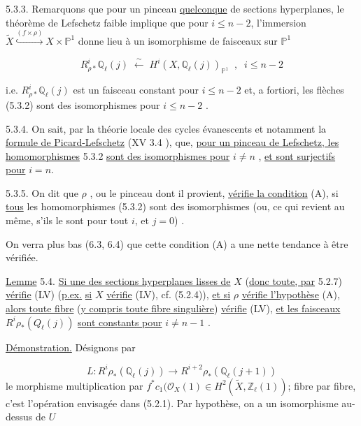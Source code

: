 5.3.3. Remarquons que pour un pinceau \underline{quelconque} de sections hyperplanes, le théorème de Lefschetz faible implique que pour $i \leq n-2$, l'immersion $\widetilde{X} \overset{(f\times\rho)}{\hookrightarrow} X\times\mathbb{P}^1$ donne lieu à un isomorphisme de faisceaux sur $\mathbb{P}^1$

\begin{equation*}
R^i_{\rho*}\mathbb{Q}_\ell(j) \; \xleftarrow{\ \sim\ } \; H^i(X,\mathbb{Q}_\ell(j))_{\mathbb{P}^1} \;\; , \;\; i \leq n-2
\end{equation*}


 i.e. $R^i_{\rho *}\mathbb{Q}_\ell(j)$ est un faisceau constant pour $i \leq n-2$ et, a fortiori, les flèches (5.3.2) sont des isomorphismes pour $i \leq n-2$ .

5.3.4. On sait, par la théorie locale des cycles évanescents et notamment la \underline{formule de Picard-Lefschetz} (XV 3.4 ), que, \underline{pour un pinceau de Lefschetz, les homomorphismes} 5.3.2 \underline{sont des isomorphismes pour} $i \neq n$ , \underline{et sont surjectifs pour} $i = n$.

5.3.5. On dit que $\rho$ , ou le pinceau dont il provient, \underline{vérifie la condition} (A), si \underline{tous} les homomorphismes (5.3.2) sont des isomorphismes (ou, ce qui revient au même, s'ils le sont pour tout $i$, et $j = 0$) .

On verra plus bas (6.3, 6.4) que cette condition (A) a une nette tendance à être vérifiée.

\underline{Lemme} 5.4. \underline{Si une des sections hyperplanes lisses de} $X$ (\underline{donc toute, par} 5.2.7) \underline{vérifie} (LV) (\underline{p.ex.} \underline{si} $X$ \underline{vérifie} (LV), cf. (5.2.4)), \underline{et si} $\rho$ \underline{vérifie l'hypothèse} (A), \underline{alors toute fibre} (\underline{y compris toute fibre singulière}) \underline{vérifie} (LV), \underline{et les faisceaux} $R^i\rho_*(Q_\ell(j))$ \underline{sont constants pour} $i \neq n-1$ .

\underline{Démonstration.} Désignons par

\begin{equation*}
L : R^i\rho_*(\mathbb{Q}_\ell(j)) \longrightarrow R^{i+2}\rho_*(\mathbb{Q}_\ell(j+1))
\end{equation*}
le morphisme multiplication par $f^*c_1(\mathcal{O}_X(1) \in H^2(\widetilde{X},\mathbb{Z}_\ell(1))$; fibre par fibre, c'est l'opération envisagée dans (5.2.1). Par hypothèse, on a
un isomorphisme au-dessus de $U$

